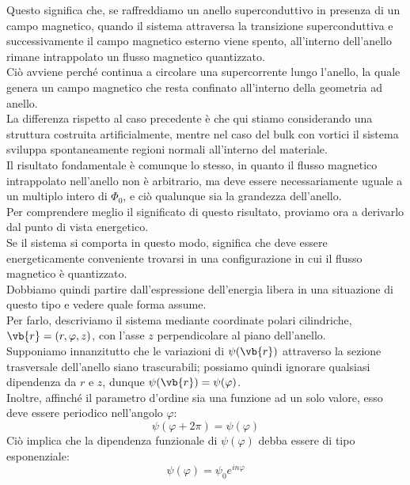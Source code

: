 Questo significa che, se raffreddiamo un anello superconduttivo in presenza di un campo magnetico, quando il sistema attraversa la transizione superconduttiva e successivamente il campo magnetico esterno viene spento, all'interno dell'anello rimane intrappolato un flusso magnetico quantizzato.\\
Ciò avviene perché continua a circolare una supercorrente lungo l'anello, la quale genera un campo magnetico che resta confinato all'interno della geometria ad anello.\\
La differenza rispetto al caso precedente è che qui stiamo considerando una struttura costruita artificialmente, mentre nel caso del bulk con vortici il sistema sviluppa spontaneamente regioni normali all'interno del materiale.\\
Il risultato fondamentale è comunque lo stesso, in quanto il flusso magnetico intrappolato nell'anello non è arbitrario, ma deve essere necessariamente uguale a un multiplo intero di $\Phi_0$, e ciò qualunque sia la grandezza dell'anello.\\
Per comprendere meglio il significato di questo risultato, proviamo ora a derivarlo dal punto di vista energetico.\\
Se il sistema si comporta in questo modo, significa che deve essere energeticamente conveniente trovarsi in una configurazione in cui il flusso magnetico è quantizzato.\\
Dobbiamo quindi partire dall'espressione dell'energia libera in una situazione di questo tipo e vedere quale forma assume.\\
Per farlo, descriviamo il sistema mediante coordinate polari cilindriche, $\vb{r} = (r,\varphi,z)$, con l'asse $z$ perpendicolare al piano dell'anello.\\ Supponiamo innanzitutto che le variazioni di $\psi(\vb{r})$ attraverso la sezione trasversale dell'anello siano trascurabili; possiamo quindi ignorare qualsiasi dipendenza da $r$ e $z$, dunque $\psi(\vb{r})=\psi(\varphi)$.\\ 
Inoltre, affinché il parametro d'ordine sia una funzione ad un solo valore, esso deve essere periodico nell'angolo $\varphi$:
\begin{equation}
   \psi(\varphi+2\pi)=\psi(\varphi)
   \label{eq:condizione_singolo_valore_psi}
\end{equation}
Ciò implica che la dipendenza funzionale di $\psi(\varphi)$ debba essere di tipo esponenziale:
\begin{equation*}
   \psi(\varphi)=\psi_0 e^{in\varphi}
\end{equation*}
